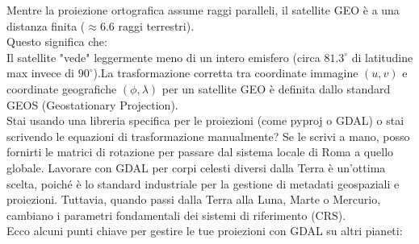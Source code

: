 \documentclass[a4paper,14pt]{article}
\begin{document}
Mentre la proiezione ortografica assume raggi paralleli, il satellite GEO è a una distanza finita (\(\approx 6.6\) raggi terrestri).\\
Questo significa che:\\
Il satellite "vede" leggermente meno di un intero emisfero (circa \(81.3^{\circ }\) di latitudine max invece di \(90^{\circ }\)).La trasformazione corretta tra coordinate immagine \((u,v)\) e coordinate geografiche \((\phi ,\lambda )\) per un satellite GEO è definita dallo standard GEOS (Geostationary Projection).\\
Stai usando una libreria specifica per le proiezioni (come pyproj o GDAL) o stai scrivendo le equazioni di trasformazione manualmente? Se le scrivi a mano, posso fornirti le matrici di rotazione per passare dal sistema locale di Roma a quello globale.
Lavorare con GDAL per corpi celesti diversi dalla Terra è un'ottima scelta, poiché è lo standard industriale per la gestione di metadati geospaziali e proiezioni. Tuttavia, quando passi dalla Terra alla Luna, Marte o Mercurio, cambiano i parametri fondamentali dei sistemi di riferimento (CRS).\\
Ecco alcuni punti chiave per gestire le tue proiezioni con GDAL su altri pianeti:\\
\end{document}
